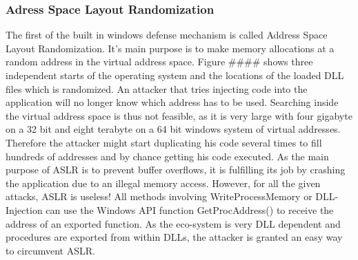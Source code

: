 \subsubsection{Adress Space Layout Randomization}
The first of the built in windows defense mechanism is called Address Space Layout Randomization. It's main purpose is to make memory allocations at a random address in the virtual address space. Figure \#\#\#\# shows three independent starts of the operating system and the locations of the loaded DLL files which is randomized. An attacker that tries injecting code into the application will no longer know which address has to be used. Searching inside the virtual address space is thus not feasible, as it is very large with four gigabyte on a 32 bit and eight terabyte on a 64 bit windows system of virtual addresses. Therefore the attacker might start duplicating his code several times to fill hundreds of addresses and by chance getting his code executed. As the main purpose of ASLR is to prevent buffer overflows, it is fulfilling its job by crashing the application due to an illegal memory access. However, for all the given attacks, ASLR is useless! All methods involving WriteProcessMemory or DLL-Injection can use the Windows API function GetProcAddress() to receive the address of an exported function. As the eco-system is very DLL dependent and procedures are exported from within DLLs, the attacker is granted an easy way to circumvent ASLR.
